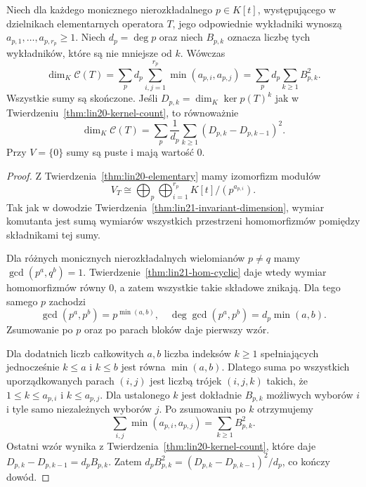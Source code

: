 \begin{twierdzenie}
\label{thm:lin21-elementary-dimension}
Niech dla każdego monicznego
nierozkładalnego \(p\in K[t]\),
występującego w dzielnikach
elementarnych operatora \(T\),
jego odpowiednie wykładniki
wynoszą \(a_{p,1},\ldots,a_{p,r_p}\ge1\).
Niech \(d_p=\deg p\)
oraz niech \(B_{p,k}\) oznacza
liczbę tych wykładników,
które są nie mniejsze od \(k\).
Wówczas
\[
 \dim_K\mathcal C(T)
 =\sum_p d_p\sum_{i,j=1}^{r_p}
                   \min(a_{p,i},a_{p,j})
 =\sum_p d_p\sum_{k\ge1} B_{p,k}^2.
\]
Wszystkie sumy są skończone.
Jeśli
\(D_{p,k}=\dim_K\ker p(T)^k\)
jak w
Twierdzeniu~\ref{thm:lin20-kernel-count},
to równoważnie
\[
 \dim_K\mathcal C(T)=
 \sum_p\frac{1}{d_p}
 \sum_{k\ge1}(D_{p,k}-D_{p,k-1})^2.
\]
Przy \(V=\{0\}\) sumy są puste
i mają wartość \(0\).
\end{twierdzenie}
\begin{proof}
Z Twierdzenia~\ref{thm:lin20-elementary}
mamy izomorfizm modułów
\[
 V_T\cong
 \bigoplus_p\bigoplus_{i=1}^{r_p}
           K[t]/(p^{a_{p,i}}).
\]
Tak jak w dowodzie
Twierdzenia~\ref{thm:lin21-invariant-dimension},
wymiar komutanta jest sumą wymiarów
wszystkich przestrzeni homomorfizmów
pomiędzy składnikami tej sumy.

Dla różnych monicznych nierozkładalnych
wielomianów \(p\ne q\)
mamy \(\gcd(p^a,q^b)=1\).
Twierdzenie~\ref{thm:lin21-hom-cyclic}
daje wtedy wymiar homomorfizmów
równy \(0\), a zatem
wszystkie takie składowe znikają.
Dla tego samego \(p\)
zachodzi
\[
 \gcd(p^a,p^b)=p^{\min(a,b)},
 \quad
 \deg\gcd(p^a,p^b)=d_p\min(a,b).
\]
Zsumowanie po \(p\) oraz
po parach bloków daje pierwszy wzór.

Dla dodatnich liczb całkowitych \(a,b\)
liczba indeksów \(k\ge1\)
spełniających jednocześnie \(k\le a\)
i \(k\le b\) jest równa \(\min(a,b)\).
Dlatego suma po wszystkich
uporządkowanych parach \((i,j)\)
jest liczbą trójek \((i,j,k)\)
takich, że
\(1\le k\le a_{p,i}\) i \(k\le a_{p,j}\).
Dla ustalonego \(k\) jest
dokładnie \(B_{p,k}\) możliwych
wyborów \(i\) i tyle samo
niezależnych wyborów \(j\).
Po zsumowaniu po \(k\) otrzymujemy
\[
 \sum_{i,j}\min(a_{p,i},a_{p,j})
 =\sum_{k\ge1}B_{p,k}^2.
\]
Ostatni wzór wynika z
Twierdzenia~\ref{thm:lin20-kernel-count},
które daje
\(D_{p,k}-D_{p,k-1}=d_p B_{p,k}\).
Zatem
\(d_p B_{p,k}^2=
 (D_{p,k}-D_{p,k-1})^2/d_p\),
co kończy dowód.
\end{proof}


